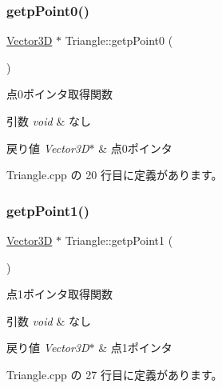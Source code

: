 \subsubsection{\texorpdfstring{getp\+Point0()}{getpPoint0()}}
{\footnotesize\ttfamily \mbox{\hyperlink{class_vector3_d}{Vector3D}} $\ast$ Triangle\+::getp\+Point0 (\begin{DoxyParamCaption}{ }\end{DoxyParamCaption})}



点0ポインタ取得関数 


\begin{DoxyParams}{引数}
{\em void} & なし \\
\hline
\end{DoxyParams}

\begin{DoxyRetVals}{戻り値}
{\em Vector3\+D$\ast$} & 点0ポインタ \\
\hline
\end{DoxyRetVals}


 Triangle.\+cpp の 20 行目に定義があります。

\mbox{\label{class_triangle_aa97b6da9dfc28c1eea93bb5538004794}} 
\subsubsection{\texorpdfstring{getp\+Point1()}{getpPoint1()}}
{\footnotesize\ttfamily \mbox{\hyperlink{class_vector3_d}{Vector3D}} $\ast$ Triangle\+::getp\+Point1 (\begin{DoxyParamCaption}{ }\end{DoxyParamCaption})}



点1ポインタ取得関数 


\begin{DoxyParams}{引数}
{\em void} & なし \\
\hline
\end{DoxyParams}

\begin{DoxyRetVals}{戻り値}
{\em Vector3\+D$\ast$} & 点1ポインタ \\
\hline
\end{DoxyRetVals}


 Triangle.\+cpp の 27 行目に定義があります。

\mbox{\label{class_triangle_a99a2a556b7c1cba1c5e777cebbb843d4}} 
